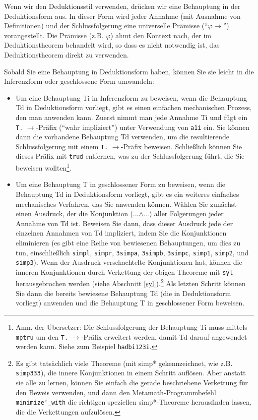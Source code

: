 Wenn wir den Deduktionsstil verwenden, drücken wir eine Behauptung in der Deduktionsform aus. In dieser Form wird jeder Annahme (mit Ausnahme von Definitionen) und der Schlussfolgerung eine universelle Prämisse ("`$\varphi \rightarrow$"') vorangestellt. Die Prämisse (z.B. $\varphi$) ahmt den Kontext nach, der im Deduktionstheorem behandelt wird, so dass es nicht notwendig ist, das Deduktionstheorem direkt zu verwenden.

Sobald Sie eine Behauptung in Deduktionsform haben, können Sie sie leicht in die Inferenzform oder geschlossene Form umwandeln:

\begin{itemize}
\item Um eine Behauptung Ti in Inferenzform zu beweisen, wenn die Behauptung Td in Deduktionsform vorliegt, gibt es einen einfachen mechanischen Prozess, den man anwenden kann. Zuerst nimmt man jede Annahme Ti und fügt ein \texttt{T.} $\rightarrow$-Präfix ("`wahr impliziert"') unter Verwendung von \texttt{a1i} ein. Sie können dann die vorhandene Behauptung Td verwenden, um die resultierende Schlussfolgerung mit einem \texttt{T.} $\rightarrow$-Präfix beweisen. Schließlich können Sie dieses Präfix mit \texttt{trud} entfernen, was zu der Schlussfolgerung führt, die Sie beweisen wollten\footnote{Anm. der Übersetzer: Die Schlussfolgerung der Behauptung Ti muss mittels \texttt{mptru} um den \texttt{T.} $\rightarrow$-Präfix erweitert werden, damit Td darauf angewendet werden kann. Siehe zum Beispiel \texttt{hadbi123i}.}. 
\item Um eine Behauptung T in geschlossener Form zu beweisen, wenn die Behauptung Td in Deduktionsform vorliegt, gibt es ein weiteres einfaches mechanisches Verfahren, das Sie anwenden können. Wählen Sie zunächst einen Ausdruck, der die Konjunktion (...$\land$...) aller Folgerungen jeder Annahme von Td ist. Beweisen Sie dann, dass dieser Ausdruck jede der einzelnen Annahmen von Td impliziert, indem Sie die Konjunktionen eliminieren (es gibt eine Reihe von bewiesenen Behauptungen, um dies zu tun, einschließlich
\texttt{simpl},
\texttt{simpr},
\texttt{3simpa},
\texttt{3simpb},
\texttt{3simpc},
\texttt{simp1},
\texttt{simp2},
und
\texttt{simp3}).
Wenn der Ausdruck verschachtelte Konjunktionen hat, können die inneren Konjunktionen durch Verkettung der obigen Theoreme mit \texttt{syl} herausgebrochen werden (siehe Abschnitt \ref{syl}).\footnote{Es gibt tatsächlich viele Theoreme (mit simp* gekennzeichnet, wie z.B. \texttt{simp333}), die innere Konjunktionen in einem Schritt auflösen. Aber anstatt sie alle zu lernen, können Sie einfach die gerade beschriebene Verkettung für den Beweis verwenden, und dann den Metamath-Programmbefehl \texttt{minimize{\char`\_}with} die richtigen speziellen simp*-Theoreme herausfinden lassen, die die Verkettungen aufzulösen.} Als letzten Schritt können Sie dann die bereits bewiesene Behauptung Td (die in Deduktionsform vorliegt) anwenden und die Behauptung T in geschlossener Form beweisen.
\end{itemize}


